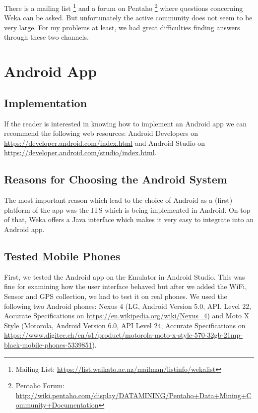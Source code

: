 There is a mailing list \footnote{Mailing List: \url{https://list.waikato.ac.nz/mailman/listinfo/wekalist}} and a forum on Pentaho \footnote{Pentaho Forum: \url{http://wiki.pentaho.com/display/DATAMINING/Pentaho+Data+Mining+Community+Documentation}} where questions concerning Weka can be asked. But unfortunately the active community does not seem to be very large. For my problems at least, we had great difficulties finding answers through these two channels.




\section{Android App}

\subsection{Implementation}
If the reader is interested in knowing how to implement an Android app we can recommend the following web resources: Android Developers on \url{https://developer.android.com/index.html} and Android Studio on
\url{https://developer.android.com/studio/index.html}.



\subsection{Reasons for Choosing the Android System}
The most important reason which lead to the choice of Android as a (first) platform of the app was the ITS which is being implemented in Android. On top of that, Weka offers a Java interface which makes it very easy to integrate into an Android app.

\subsection{Tested Mobile Phones}

First, we tested the Android app on the Emulator in Android Studio. This was fine for examining how the user interface behaved but after we added the WiFi, Sensor and GPS collection, we had to test it on real phones. We used the following two Android phones:
Nexus 4 (LG, Android Version 5.0, API, Level 22, Accurate Specifications on  \url{https://en.wikipedia.org/wiki/Nexus_4}) and Moto X Style (Motorola, Android Version 6.0, API Level 24, Accurate Specifications on  \url{https://www.digitec.ch/en/s1/product/motorola-moto-x-style-570-32gb-21mp-black-mobile-phones-5339851}).




